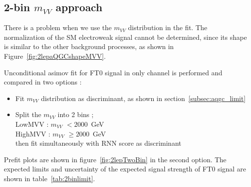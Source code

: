\subsection{2-bin $m_{VV}$ approach}
\label{subsec:2binapproach}

There is a problem when we use the $m_{VV}$ distribution in the fit.
The normalization of the SM electroweak signal cannot be determined, since its shape is similar to the other background processes, as shown in Figure~\ref{fig:2lepaQGCshapeMVV}.

Unconditional asimov fit for FT0 signal in only \tlep channel is performed and compared in two options :
\begin{itemize}
  \item Fit $m_{VV}$ distribution as discriminant, as shown in section~\ref{subsec:aqgc_limit}
  \item Split the $m_{VV}$ into 2 bins ;  \\
        LowMVV : $m_{VV}$ $< 2000$~GeV \\
        HighMVV : $m_{VV}$ $\geq 2000$~GeV \\
        then fit simultaneously with RNN score as discriminant
\end{itemize}
Prefit plots are shown in figure~\ref{fig:2lepTwoBin} in the second option.
The expected limits and uncertainty of the expected signal strength of FT0 signal are shown in table~\ref{tab:2binlimit}.

